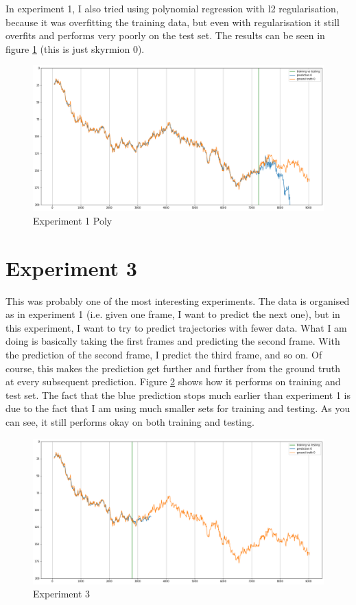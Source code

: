 \documentclass[a4paper]{article}
\begin{document}
In experiment 1, I also tried using polynomial regression with l2 regularisation, because it was overfitting the training data, but even with regularisation it still overfits and performs very poorly on the test set. The results can be seen in figure \ref{fig:exp1poly} (this is just skyrmion 0).

\begin{figure}[h]
  \centering
  \includegraphics[width=\textwidth]{exp 1 poly}
  \caption{Experiment 1 Poly}
  \label{fig:exp1poly}
\end{figure}

\section{Experiment 3}
This was probably one of the most interesting experiments. The data is organised as in experiment 1 (i.e. given one frame, I want to predict the next one), but in this experiment, I want to try to predict trajectories with fewer data. What I am doing is basically taking the first frames and predicting the second frame. With the prediction of the second frame, I predict the third frame, and so on. Of course, this makes the prediction get further and further from the ground truth at every subsequent prediction. Figure \ref{fig:exp3} shows how it performs on training and test set. The fact that the blue prediction stops much earlier than experiment 1 is due to the fact that I am using much smaller sets for training and testing. As you can see, it still performs okay on both training and testing.

\begin{figure}[h]
  \centering
  \includegraphics[width=\textwidth]{exp 3}
  \caption{Experiment 3}
  \label{fig:exp3}
\end{figure}
\end{document}

